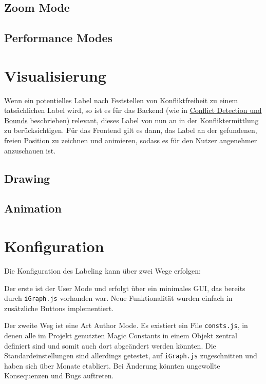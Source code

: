\documentclass[final,nopreprintline]{elsarticle}
\begin{document}
\subsection{Zoom Mode}
\label{subsec:zoom}
    

\subsection{Performance Modes}
\label{subsec:perf}
    


\section{Visualisierung}
\label{sec:visualization}
Wenn ein potentielles Label nach Feststellen von Konfliktfreiheit zu einem tatsächlichen Label wird, so ist es für das Backend (wie in \hyperref[sec:conflict]{Conflict Detection und Bounds} beschrieben) relevant, dieses Label von nun an in der Konfliktermittlung zu berücksichtigen.
Für das Frontend gilt es dann, das Label an der gefundenen, freien Position zu zeichnen und animieren, sodass es für den Nutzer angenehmer anzuschauen ist.


\subsection{Drawing}
\label{subsec:draw}
    

\subsection{Animation}
\label{subsec:animate}
    


\section{Konfiguration}
\label{sec:configuration}

Die Konfiguration des Labeling kann über zwei Wege erfolgen:

Der erste ist der User Mode und erfolgt über ein minimales GUI, das bereits durch \texttt{iGraph.js} vorhanden war.
Neue Funktionalität wurden einfach in zusätzliche Buttons implementiert.

Der zweite Weg ist eine Art Author Mode. Es existiert ein File \texttt{consts.js}, in denen alle im Projekt
genutzten Magic Constants in einem Objekt zentral definiert sind und somit auch dort abgeändert werden könnten.
Die Standardeinstellungen sind allerdings getestet, auf \texttt{iGraph.js} zugeschnitten und haben sich über Monate etabliert.
Bei Änderung könnten ungewollte Konsequenzen und Bugs auftreten.
\end{document}
